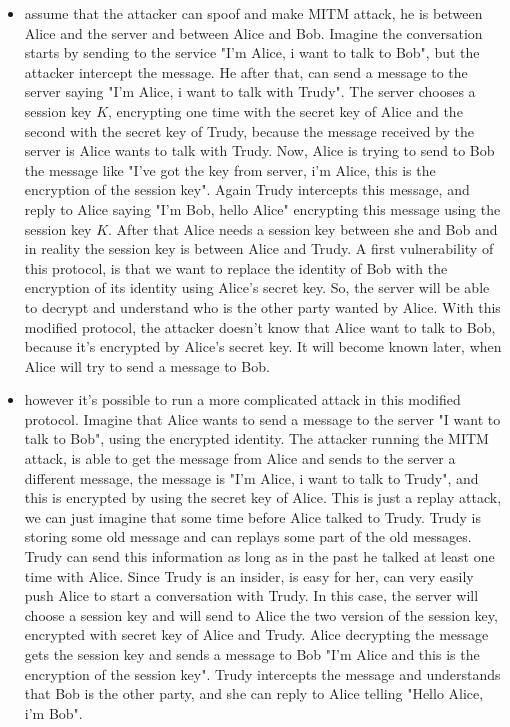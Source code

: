 \documentclass[11pt]{article}
\begin{document}
\begin{itemize}
\item assume that the attacker can spoof and make MITM attack, he is between Alice and the server and between Alice and Bob. Imagine the conversation starts by sending to the service "I'm Alice, i want to talk to Bob", but the attacker intercept the message. He after that, can send a message to the server saying "I'm Alice, i want to talk with Trudy". The server chooses a session key $K$, encrypting one time with the secret key of Alice and the second with the secret key of Trudy, because the message received by the server is Alice wants to talk with Trudy. Now, Alice is trying to send to Bob the message like "I've got the key from server, i'm Alice, this is the encryption of the session key". Again Trudy intercepts this message, and reply to Alice saying "I'm Bob, hello Alice" encrypting this message using the session key $K$. After that Alice needs a session key between she and Bob and in reality the session key is between Alice and Trudy. A first vulnerability of this protocol, is that we want to replace the identity of Bob with the encryption of its identity using Alice's secret key. So, the server will be able to decrypt and understand who is the other party wanted by Alice. With this modified protocol, the attacker doesn't know that Alice want to talk to Bob, because it's encrypted by Alice's secret key. It will become known later, when Alice will try
to send a message to Bob.
\item however it's possible to run a more complicated attack in this modified protocol. Imagine that Alice wants to send a message to the server "I want to talk to Bob", using the encrypted identity. The attacker running the MITM attack, is able to get the message from Alice and sends to the server a different message, the message is "I'm Alice, i want to talk to Trudy", and this is encrypted by using the secret key of Alice. This is just a replay attack, we can just imagine that some time before Alice talked to Trudy. Trudy is storing some old message and can replays some part of the old messages. Trudy can send this information as long as in the past he talked at least one time with Alice. Since Trudy is an insider, is easy for her, can very easily push Alice to start a conversation with Trudy. In this case, the server will choose a session key and will send to Alice the two version of the session key, encrypted with secret key of Alice and Trudy. Alice decrypting the message gets the session key and sends a message to Bob "I'm Alice and this is the encryption of the session key". Trudy intercepts the message and understands that Bob is the other party, and she can reply to Alice telling "Hello Alice, i'm Bob".
\end{itemize}
\end{document}
